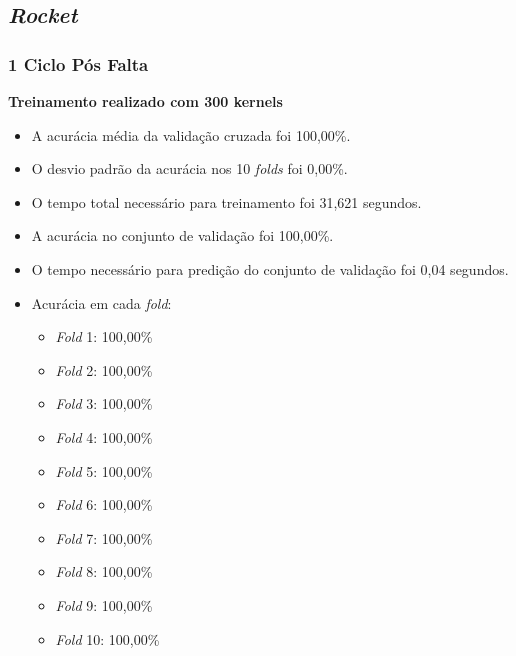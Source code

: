 \subsection{\textit{Rocket}}
\subsubsection{1 Ciclo Pós Falta}
\textbf{Treinamento realizado com 300 kernels}
\begin{itemize}
    \item A acurácia média da validação cruzada foi 100,00\%.
    \item O desvio padrão da acurácia nos 10 \textit{folds} foi 0,00\%.
    \item O tempo total necessário para treinamento foi 31,621 segundos.
    \item A acurácia no conjunto de validação foi 100,00\%.
    \item O tempo necessário para predição do conjunto de validação foi 0,04 segundos.
    \item Acurácia em cada \textit{fold}:
    \begin{itemize}
        \item \textit{Fold} 1: 100,00\%
        \item \textit{Fold} 2: 100,00\%
        \item \textit{Fold} 3: 100,00\%
        \item \textit{Fold} 4: 100,00\%
        \item \textit{Fold} 5: 100,00\%
        \item \textit{Fold} 6: 100,00\%
        \item \textit{Fold} 7: 100,00\%
        \item \textit{Fold} 8: 100,00\%
        \item \textit{Fold} 9: 100,00\%
        \item \textit{Fold} 10: 100,00\%
    \end{itemize}

\end{itemize}

